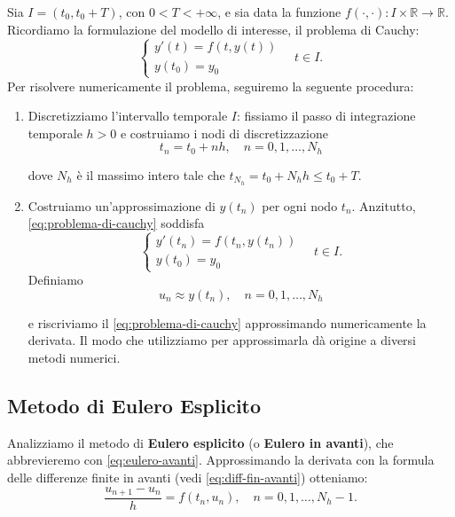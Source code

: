 Sia $I=( t_{0} ,t_{0} +T)$, con $0< T< +\infty $, e sia data la funzione $f( \cdot ,\cdot ) :I\times \mathbb{R}\rightarrow \mathbb{R}$.
Ricordiamo la formulazione del modello di interesse, il problema di Cauchy:
\begin{equation*}
\tag{PC}
\begin{cases}
y'(t) =f( t,y(t))\\
y( t_{0}) =y_{0}
\end{cases} \quad t\in I.
\end{equation*}
Per risolvere numericamente il problema, seguiremo la seguente procedura:
\begin{enumerate}
\item Discretizziamo l'intervallo temporale $I$: fissiamo il passo di integrazione temporale $h >0$  e costruiamo i nodi di discretizzazione
\begin{equation*}
t_{n} =t_{0} +nh,\quad n=0,1,\dotsc ,N_{h}
\end{equation*}

dove $N_{h}$ è il massimo intero tale che $t_{N_{h}} =t_{0} +N_{h} h\leqslant t_{0} +T$.
\item Costruiamo un'approssimazione di $y( t_{n})$ per ogni nodo $t_{n}$. Anzitutto, \eqref{eq:problema-di-cauchy} soddisfa
\begin{equation*}
\begin{cases}
y'( t_{n}) =f( t_{n} ,y( t_{n}))\\
y( t_{0}) =y_{0}
\end{cases} \quad t\in I.
\end{equation*}
Definiamo
\begin{equation*}
u_{n} \approx y( t_{n}) ,\quad n=0,1,\dotsc ,N_{h}
\end{equation*}

e riscriviamo il \eqref{eq:problema-di-cauchy} approssimando numericamente la derivata.
Il modo che utilizziamo per approssimarla dà origine a diversi metodi numerici.
\end{enumerate}

\subsection{Metodo di Eulero Esplicito}
Analizziamo il metodo di \textbf{Eulero esplicito} (o \textbf{Eulero in avanti}), che abbrevieremo con \eqref{eq:eulero-avanti}.
Approssimando la derivata con la formula delle differenze finite in avanti (vedi \eqref{eq:diff-fin-avanti}) otteniamo:
\begin{equation*}
\frac{u_{n+1} -u_{n}}{h} =f( t_{n} ,u_{n}) ,\quad n=0,1,\dotsc ,N_{h} -1.
\end{equation*}

